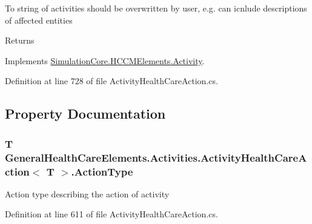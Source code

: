 To string of activities should be overwritten by user, e.\+g. can icnlude descriptions of affected entities 

\begin{DoxyReturn}{Returns}

\end{DoxyReturn}


Implements \hyperlink{class_simulation_core_1_1_h_c_c_m_elements_1_1_activity_a352124cf18f8505e51c8847a71769f7d}{Simulation\+Core.\+H\+C\+C\+M\+Elements.\+Activity}.



Definition at line 728 of file Activity\+Health\+Care\+Action.\+cs.



\subsection{Property Documentation}
\subsubsection[{\texorpdfstring{Action\+Type}{ActionType}}]{\setlength{\rightskip}{0pt plus 5cm}T {\bf General\+Health\+Care\+Elements.\+Activities.\+Activity\+Health\+Care\+Action}$<$ T $>$.Action\+Type\hspace{0.3cm}{\ttfamily [get]}}\hypertarget{class_general_health_care_elements_1_1_activities_1_1_activity_health_care_action_a1335426886e01ab0cdaf6adc5de53314}{}\label{class_general_health_care_elements_1_1_activities_1_1_activity_health_care_action_a1335426886e01ab0cdaf6adc5de53314}


Action type describing the action of activity 



Definition at line 611 of file Activity\+Health\+Care\+Action.\+cs.

